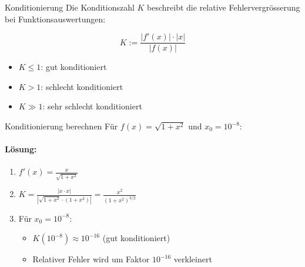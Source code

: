 \begin{concept}{Konditionierung}
    Die Konditionszahl $K$ beschreibt die relative Fehlervergrösserung bei Funktionsauswertungen:
    \vspace{1mm}\\
\begin{minipage}{0.3\textwidth}
    \vspace{-2mm}
    $$K := \frac{|f'(x)| \cdot |x|}{|f(x)|}$$
\end{minipage}
\hspace{2mm}
\begin{minipage}{0.6\textwidth}
\begin{itemize}
    \item $K \leq 1$: gut konditioniert
    \item $K > 1$: schlecht konditioniert
    \item $K \gg 1$: sehr schlecht konditioniert
\end{itemize}
\end{minipage}
\end{concept}

\begin{example2}{Konditionierung berechnen}
Für $f(x) = \sqrt{1+x^2}$ und $x_0 = 10^{-8}$:

\paragraph{Lösung:}
\begin{enumerate}
    \item $f'(x) = \frac{x}{\sqrt{1+x^2}}$
    \item $K = \frac{|x \cdot x|}{|\sqrt{1+x^2} \cdot (1+x^2)|} = \frac{x^2}{(1+x^2)^{3/2}}$
    \item Für $x_0 = 10^{-8}$:
    \begin{itemize}
        \item $K(10^{-8}) \approx 10^{-16}$ (gut konditioniert)
        \item Relativer Fehler wird um Faktor $10^{-16}$ verkleinert
    \end{itemize}
\end{enumerate}
\end{example2}

